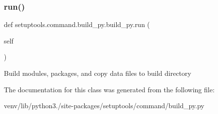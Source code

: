 \subsubsection{\texorpdfstring{run()}{run()}}
{\footnotesize\ttfamily def setuptools.\+command.\+build\+\_\+py.\+build\+\_\+py.\+run (\begin{DoxyParamCaption}\item[{}]{self }\end{DoxyParamCaption})}

\begin{DoxyVerb}Build modules, packages, and copy data files to build directory\end{DoxyVerb}
 

The documentation for this class was generated from the following file\+:\begin{DoxyCompactItemize}
\item 
venv/lib/python3./site-\/packages/setuptools/command/build\+\_\+py.\+py\end{DoxyCompactItemize}
